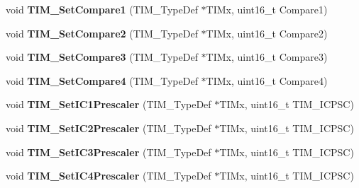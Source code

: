 \begin{DoxyCompactItemize}
\item 
\hypertarget{group__TIM__Exported__Functions_gab3a6031f187cb8af62eb09a67b4fd2ad}{
void {\bfseries TIM\_\-SetCompare1} (TIM\_\-TypeDef $\ast$TIMx, uint16\_\-t Compare1)}
\label{group__TIM__Exported__Functions_gab3a6031f187cb8af62eb09a67b4fd2ad}

\item 
\hypertarget{group__TIM__Exported__Functions_ga0175ef4fabade443909002a63d4e9758}{
void {\bfseries TIM\_\-SetCompare2} (TIM\_\-TypeDef $\ast$TIMx, uint16\_\-t Compare2)}
\label{group__TIM__Exported__Functions_ga0175ef4fabade443909002a63d4e9758}

\item 
\hypertarget{group__TIM__Exported__Functions_ga416df50f4223351e366ae40a4ec163ae}{
void {\bfseries TIM\_\-SetCompare3} (TIM\_\-TypeDef $\ast$TIMx, uint16\_\-t Compare3)}
\label{group__TIM__Exported__Functions_ga416df50f4223351e366ae40a4ec163ae}

\item 
\hypertarget{group__TIM__Exported__Functions_gaf428edf474804691d6f587e78c97a082}{
void {\bfseries TIM\_\-SetCompare4} (TIM\_\-TypeDef $\ast$TIMx, uint16\_\-t Compare4)}
\label{group__TIM__Exported__Functions_gaf428edf474804691d6f587e78c97a082}

\item 
\hypertarget{group__TIM__Exported__Functions_gaf0f684dea88e222de9689d8ed0ca8805}{
void {\bfseries TIM\_\-SetIC1Prescaler} (TIM\_\-TypeDef $\ast$TIMx, uint16\_\-t TIM\_\-ICPSC)}
\label{group__TIM__Exported__Functions_gaf0f684dea88e222de9689d8ed0ca8805}

\item 
\hypertarget{group__TIM__Exported__Functions_ga3cc4869b5fe73271808512c89322a325}{
void {\bfseries TIM\_\-SetIC2Prescaler} (TIM\_\-TypeDef $\ast$TIMx, uint16\_\-t TIM\_\-ICPSC)}
\label{group__TIM__Exported__Functions_ga3cc4869b5fe73271808512c89322a325}

\item 
\hypertarget{group__TIM__Exported__Functions_ga76f906383b8132ebe00dffadb70cf7f9}{
void {\bfseries TIM\_\-SetIC3Prescaler} (TIM\_\-TypeDef $\ast$TIMx, uint16\_\-t TIM\_\-ICPSC)}
\label{group__TIM__Exported__Functions_ga76f906383b8132ebe00dffadb70cf7f9}

\item 
\hypertarget{group__TIM__Exported__Functions_ga0f2c784271356d6b64b8c0da64dbdbc2}{
void {\bfseries TIM\_\-SetIC4Prescaler} (TIM\_\-TypeDef $\ast$TIMx, uint16\_\-t TIM\_\-ICPSC)}
\label{group__TIM__Exported__Functions_ga0f2c784271356d6b64b8c0da64dbdbc2}


\end{DoxyCompactItemize}
